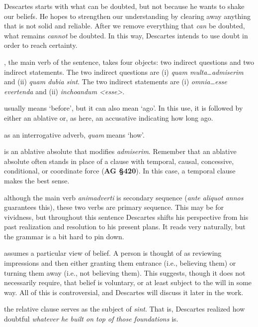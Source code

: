 \prenotes

Descartes starts with what can be doubted, but not because he wants to shake our beliefs. He hopes to strengthen our understanding by clearing away anything that is not solid and reliable. After we remove everything that \textit{can} be doubted, what remains \textit{cannot} be doubted. In this way, Descartes intends to use doubt in order to reach certainty.

, the main verb of the sentence, takes four objects: two indirect questions and two indirect statements. The two indirect questions are (i) \textit{quam multa\dots admiserim} and (ii) \textit{quam dubia sint}. The two indirect statements are (i) \textit{omnia\dots esse evertenda} and (ii) \textit{inchoandum <esse>}.

 usually means `before', but it can also mean `ago'. In this use, it is followed by either an ablative or, as here, an accusative indicating how long ago.

 as an interrogative adverb, \textit{quam} means `how'.

 is an ablative absolute that modifies \textit{admiserim}. Remember that an ablative absolute often stands in place of a clause with temporal, causal, concessive, conditional, or coordinate force (\textbf{AG §420}). In this case, a temporal clause makes the best sense.

 although the main verb \textit{animadverti} is secondary sequence (\textit{ante aliquot annos} guarantees this), these two verbs are primary sequence. This may be for vividness, but throughout this sentence Descartes shifts his perspective from his past realization and resolution to his present plans. It reads very naturally, but the grammar is a bit hard to pin down.

 assumes a particular view of belief. A person is thought of as reviewing impressions and then either granting them entrance (i.e., believing them) or turning them away (i.e., not believing them). This suggests, though it does not necessarily require, that belief is voluntary, or at least subject to the will in some way. All of this is controversial, and Descartes will discuss it later in the work.

 the relative clause serves as the subject of \textit{sint}. That is, Descartes realized how doubtful \textit{whatever he built on top of those foundations} is.

